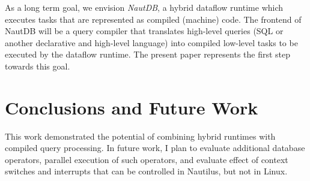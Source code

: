 \documentclass[conference]{IEEEtran}
\begin{document}
As a long term goal, we envision \emph{NautDB}, a hybrid dataflow runtime which executes tasks that are represented as compiled (machine) code. The frontend of NautDB will be a query compiler that translates high-level queries (SQL or another declarative and high-level language) into compiled low-level tasks to be executed by the dataflow runtime. The present paper represents the first step towards this goal.


\section{Conclusions and Future Work}
\label{sec:concl-future-work}

This work demonstrated the potential of combining hybrid runtimes with compiled query processing. In future work, I plan to evaluate additional database operators, parallel execution of such operators, and evaluate effect of context switches and interrupts that can be controlled in Nautilus, but not in Linux. 

  
  
\end{document}
